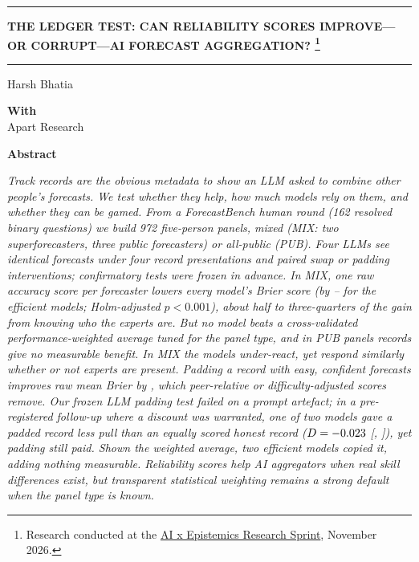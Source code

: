 \documentclass[11pt,letterpaper]{article}
\begin{document}
\thispagestyle{plain}
\begin{center}
\rule{\linewidth}{1pt}\par\vspace{8pt}
{\Large\bfseries THE LEDGER TEST: CAN RELIABILITY SCORES IMPROVE---OR CORRUPT---AI FORECAST AGGREGATION?%
\footnote{Research conducted at the \href{https://apartresearch.com/sprints/ai-x-epistemics-research-sprint-2026-11-13-to-2026-11-15}{AI x Epistemics Research Sprint}, November 2026.}}\par
\vspace{6pt}\rule{\linewidth}{0.6pt}\par\vspace{10pt}
Harsh Bhatia\par\vspace{6pt}
\textbf{With}\\Apart Research\par\vspace{10pt}
{\large\bfseries Abstract}\par\vspace{4pt}
\begin{minipage}{0.84\linewidth}\itshape\small
Track records are the obvious metadata to show an LLM asked to combine other people's forecasts. We test whether
they help, how much models rely on them, and whether they can be gamed. From a ForecastBench
human round (162 resolved binary questions) we build 972 five-person panels, mixed (MIX: two superforecasters, three
public forecasters) or all-public (PUB). Four LLMs see identical forecasts under four record presentations and
paired swap or padding interventions; confirmatory tests were frozen in advance. In MIX,
one raw accuracy score per forecaster lowers every model's Brier score (by \eOneAbsHaiku--\eOneAbsLuna{} for the
efficient models; Holm-adjusted $p<0.001$), about half to three-quarters of the gain from knowing who the experts
are. But no model beats a cross-validated performance-weighted average tuned for the panel type, and in PUB panels
records give no measurable benefit. In MIX the models under-react, yet respond similarly whether or
not experts are present. Padding a record with easy, confident forecasts improves raw mean Brier by \inflRawAbs,
which peer-relative or difficulty-adjusted scores remove. Our frozen LLM padding test failed on a prompt artefact;
in a pre-registered follow-up where a discount was warranted, one of two models gave a
padded record less pull than an equally scored honest record
($D=-0.023$ [\uoneDLoLuna, \uoneDHiLuna]), yet padding still paid. Shown the weighted average, two efficient models copied it,
adding nothing measurable. Reliability scores help AI
aggregators when real skill differences exist, but transparent statistical weighting remains a strong default when the panel type is known.
\end{minipage}
\end{center}
\vspace{6pt}
\end{document}
